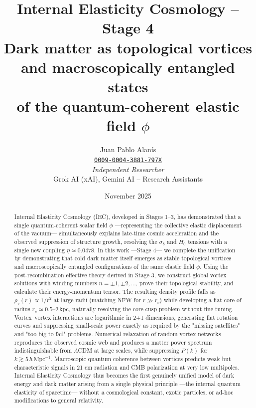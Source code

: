\documentclass[11pt,a4paper]{article}
\title{\textbf{Internal Elasticity Cosmology – Stage 4}\\
	Dark matter as topological vortices and macroscopically entangled states\\
	of the quantum-coherent elastic field $\phi$}
\author{
	Juan Pablo Alanís \\
	\href{https://orcid.org/0009-0004-3881-797X}{\texttt{0009-0004-3881-797X}} \\
	\textit{Independent Researcher} \\[2mm]
	Grok AI (xAI), Gemini AI – Research Assistants
}
\date{November 2025}
\begin{document}
	\maketitle
	
	\begin{abstract}
		Internal Elasticity Cosmology (IEC), developed in Stages 1--3, has demonstrated that a single quantum-coherent scalar field $\phi$ —representing the collective elastic displacement of the vacuum— simultaneously explains late-time cosmic acceleration and the observed suppression of structure growth, resolving the $\sigma_8$ and $H_0$ tensions with a single new coupling $\eta \simeq 0.0478$. In this work —Stage 4— we complete the unification by demonstrating that cold dark matter itself emerges as stable topological vortices and macroscopically entangled configurations of the same elastic field $\phi$. Using the post-recombination effective theory derived in Stage 3, we construct global vortex solutions with winding numbers $n=\pm1,\pm2,\dots$, prove their topological stability, and calculate their energy-momentum tensor. The resulting density profile falls as $\rho_v(r) \propto 1/r^2$ at large radii (matching NFW for $r\gg r_c$) while developing a flat core of radius $r_c \simeq 0.5$--$2\,$kpc, naturally resolving the core-cusp problem without fine-tuning. Vortex–vortex interactions are logarithmic in 2+1 dimensions, generating flat rotation curves and suppressing small-scale power exactly as required by the "missing satellites" and "too big to fail" problems. Numerical relaxation of random vortex networks reproduces the observed cosmic web and produces a matter power spectrum indistinguishable from $\Lambda$CDM at large scales, while suppressing $P(k)$ for $k\gtrsim 5\,h\,\mathrm{Mpc}^{-1}$. Macroscopic quantum coherence between vortices predicts weak but characteristic signals in 21 cm radiation and CMB polarization at very low multipoles. Internal Elasticity Cosmology thus becomes the first genuinely unified model of dark energy and dark matter arising from a single physical principle —the internal quantum elasticity of spacetime— without a cosmological constant, exotic particles, or ad-hoc modifications to general relativity.
	\end{abstract}
	
\end{document}

